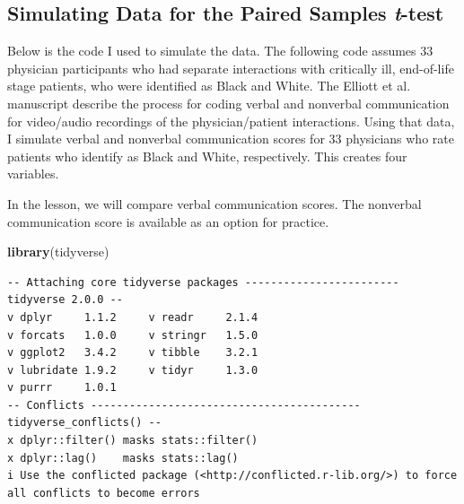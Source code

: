 \documentclass[
  11pt,
]{book}
\newenvironment{Shaded}{\begin{snugshade}}{\end{snugshade}}
\newcommand{\FunctionTok}[1]{\textcolor[rgb]{0.27,0.27,0.27}{\textbf{#1}}}
\newcommand{\NormalTok}[1]{#1}
\begin{document}
\hypertarget{simulating-data-for-the-paired-samples-t-test}{%
\subsection{\texorpdfstring{Simulating Data for the Paired Samples \emph{t}-test}{Simulating Data for the Paired Samples t-test}}\label{simulating-data-for-the-paired-samples-t-test}}

Below is the code I used to simulate the data. The following code assumes 33 physician participants who had separate interactions with critically ill, end-of-life stage patients, who were identified as Black and White. The Elliott et al. \citeyearpar{elliott_differences_2016} manuscript describe the process for coding verbal and nonverbal communication for video/audio recordings of the physician/patient interactions. Using that data, I simulate verbal and nonverbal communication scores for 33 physicians who rate patients who identify as Black and White, respectively. This creates four variables.

In the lesson, we will compare verbal communication scores. The nonverbal communication score is available as an option for practice.

\begin{Shaded}
\begin{Highlighting}[]
\FunctionTok{library}\NormalTok{(tidyverse)}
\end{Highlighting}
\end{Shaded}

\begin{verbatim}
-- Attaching core tidyverse packages ------------------------ tidyverse 2.0.0 --
v dplyr     1.1.2     v readr     2.1.4
v forcats   1.0.0     v stringr   1.5.0
v ggplot2   3.4.2     v tibble    3.2.1
v lubridate 1.9.2     v tidyr     1.3.0
v purrr     1.0.1     
-- Conflicts ------------------------------------------ tidyverse_conflicts() --
x dplyr::filter() masks stats::filter()
x dplyr::lag()    masks stats::lag()
i Use the conflicted package (<http://conflicted.r-lib.org/>) to force all conflicts to become errors
\end{verbatim}
\end{document}
